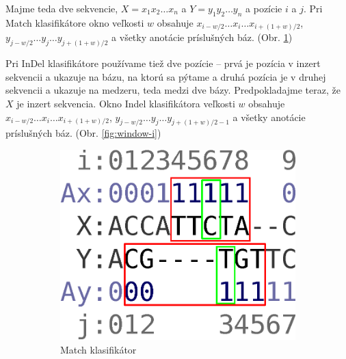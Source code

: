 Majme teda dve sekvencie, $X = x_1 x_2 \dots x_n$ a $Y = y_1 y_2 \dots y_n$ a pozície $i$ a $j$.
Pri Match klasifikátore okno veľkosti $w$ obsahuje $x_{i - w/2}\dots x_i \dots x_{i + (1 + w)/2}$, $y_{j - w/2}\dots y_j \dots y_{j + (1 + w)/2}$ a všetky anotácie príslušných báz. (Obr. \ref{fig:window-m})

Pri InDel klasifikátore používame tiež dve pozície -- prvá je pozícia v inzert sekvencii a ukazuje na bázu, na ktorú sa pýtame a druhá pozícia je v druhej sekvencii a ukazuje na medzeru, teda medzi dve bázy.
Predpokladajme teraz, že $X$ je inzert sekvencia. Okno Indel klasifikátora veľkosti $w$ obsahuje $x_{i - w/2}\dots x_i \dots x_{i + (1 + w)/2}$, $y_{j - w/2}\dots y_j \dots y_{j + (1 + w)/2 - 1}$ a všetky anotácie príslušných báz. (Obr. \ref{fig:window-i})

\begin{figure}[h]
        \centering
        \begin{subfigure}[b]{0.35\textwidth}
                \includegraphics[width=\textwidth]{images/window_m}
                \caption{Match klasifikátor}
                \label{fig:window-m}
        \end{subfigure}%
        \qquad\qquad %
        \begin{subfigure}[b]{0.35\textwidth}

\end{subfigure}
\end{figure}
